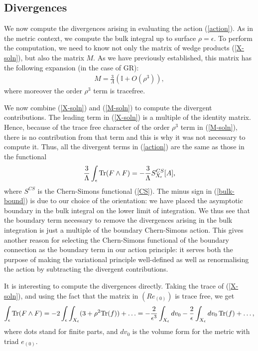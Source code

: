 \documentclass[a4paper,12pt]{article}
\newcommand{\id}{{\mathbb I}}
\newcommand{\be}{\begin{eqnarray}}
\newcommand{\ee}{\end{eqnarray}}
\begin{document}
\subsection{Divergences}

We now compute the divergences arising in evaluating the action (\ref{action}). As in the metric context, we compute the bulk integral up to surface $\rho=\epsilon$. To perform the computation, we need to know not only the matrix of wedge products (\ref{X-soln}), but also the matrix $M$. As we have previously established, this matrix has the following expansion (in the case of GR):
\be\label{M-soln}
M = \frac{3}{\Lambda} \left( \id + O(\rho^3) \right),
\ee
where moreover the order $\rho^3$ term is tracefree. 

We now combine (\ref{X-soln}) and (\ref{M-soln}) to compute the divergent contributions. The leading term in (\ref{X-soln}) is a multiple of the identity matrix. Hence, because of the trace free character of the order $\rho^3$ term in (\ref{M-soln}), there is no contribution from that term and this is why it was not necessary to compute it. Thus, all the divergent terms in (\ref{action}) are the same as those in the functional
\be\label{bulk-bound}
\frac{3}{\Lambda}\int_\epsilon {\rm Tr}(F\wedge F) = - \frac{3}{\Lambda} S^{CS}_{X_\epsilon}[A] ,
\ee
where $S^{CS}$ is the Chern-Simons functional (\ref{CS}). The minus sign in (\ref{bulk-bound}) is due to our choice of the orientation: we have placed the asymptotic boundary in the bulk integral on the lower limit of integration.  We thus see that the boundary term necessary to remove the divergences arising in the bulk integration is just a multiple of the boundary Chern-Simons action. This gives another reason for selecting the Chern-Simons functional of the boundary connection as the boundary term in our action principle: it serves both the purpose of making the variational principle well-defined as well as renormalising the action by subtracting the divergent contributions. 

It is interesting to compute the divergences directly. Taking the trace of (\ref{X-soln}), and using the fact that the matrix in $(Re_{(0)})$ is trace free, we get
\be
\int_\epsilon {\rm Tr}(F\wedge F) = -2 \int_{\epsilon} \int_{X_\epsilon} (3 + \rho^2 {\rm Tr}(f)) + \ldots=
-\frac{2}{\epsilon^3} \int_{X_\epsilon} dv_0 - \frac{2}{\epsilon} \int_{X_\epsilon} dv_0 \,{\rm Tr}(f)+ \ldots,
\ee
where dots stand for finite parts, and $dv_0$ is the volume form for the metric with triad $e_{(0)}$. 
\end{document}
